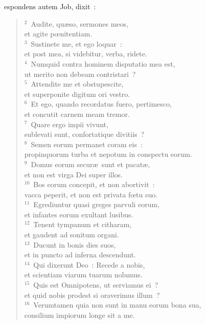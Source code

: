 \bchapter
{}espondens autem Job, dixit~:
\begin{flushleft}\begin{verse}\vspace{6pt}${}^{2}$~Audite, qu\ae so, sermones meos,\\ et agite pœnitentiam.\\
${}^{3}$~Sustinete me, et ego loquar~:\\ et post mea, si videbitur, verba, ridete.\\
${}^{4}$~Numquid contra hominem disputatio mea est,\\ ut merito non debeam contristari~?\\
${}^{5}$~Attendite me et obstupescite,\\ et superponite digitum ori vestro.\\
${}^{6}$~Et ego, quando recordatus fuero, pertimesco,\\ et concutit carnem meam tremor.\\
${}^{7}$~Quare ergo impii vivunt,\\ sublevati sunt, confortatique divitiis~?\\
${}^{8}$~Semen eorum permanet coram eis~:\\ propinquorum turba et nepotum in conspectu eorum.\\
${}^{9}$~Domus eorum secur\ae\ sunt et pacat\ae ,\\ et non est virga Dei super illos.\\
${}^{10}$~Bos eorum concepit, et non abortivit~:\\ vacca peperit, et non est privata fœtu suo.\\
${}^{11}$~Egrediuntur quasi greges parvuli eorum,\\ et infantes eorum exultant lusibus.\\
${}^{12}$~Tenent tympanum et citharam,\\ et gaudent ad sonitum organi.\\
${}^{13}$~Ducunt in bonis dies suos,\\ et in puncto ad inferna descendunt.\\
${}^{14}$~Qui dixerunt Deo~: Recede a nobis,\\ et scientiam viarum tuarum nolumus.\\
${}^{15}$~Quis est Omnipotens, ut serviamus ei~?\\ et quid nobis prodest si oraverimus illum~?\\
${}^{16}$~Verumtamen quia non sunt in manu eorum bona sua,\\ consilium impiorum longe sit a me.\\

\end{verse}
\end{flushleft}
